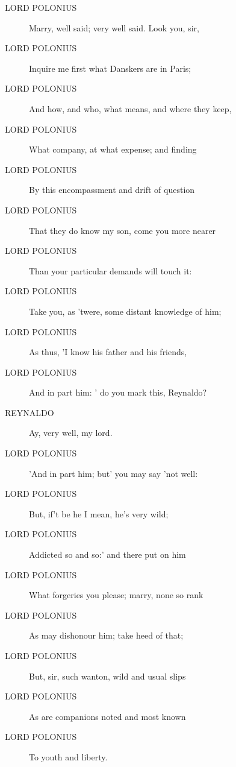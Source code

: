 \documentclass{article}
\begin{document}
\begin{description}
            
\item[LORD POLONIUS] Marry, well said; very well said. Look you, sir,
\item[LORD POLONIUS] Inquire me first what Danskers are in Paris;
\item[LORD POLONIUS] And how, and who, what means, and where they keep,
\item[LORD POLONIUS] What company, at what expense; and finding
\item[LORD POLONIUS] By this encompassment and drift of question
\item[LORD POLONIUS] That they do know my son, come you more nearer
\item[LORD POLONIUS] Than your particular demands will touch it:
\item[LORD POLONIUS] Take you, as 'twere, some distant knowledge of him;
\item[LORD POLONIUS] As thus, 'I know his father and his friends,
\item[LORD POLONIUS] And in part him: ' do you mark this, Reynaldo?
\end{description}
          
\begin{description}
            
\item[REYNALDO] Ay, very well, my lord.
\end{description}
          
\begin{description}
            
\item[LORD POLONIUS] 'And in part him; but' you may say 'not well:
\item[LORD POLONIUS] But, if't be he I mean, he's very wild;
\item[LORD POLONIUS] Addicted so and so:' and there put on him
\item[LORD POLONIUS] What forgeries you please; marry, none so rank
\item[LORD POLONIUS] As may dishonour him; take heed of that;
\item[LORD POLONIUS] But, sir, such wanton, wild and usual slips
\item[LORD POLONIUS] As are companions noted and most known
\item[LORD POLONIUS] To youth and liberty.
\end{description}
          
\end{document}
